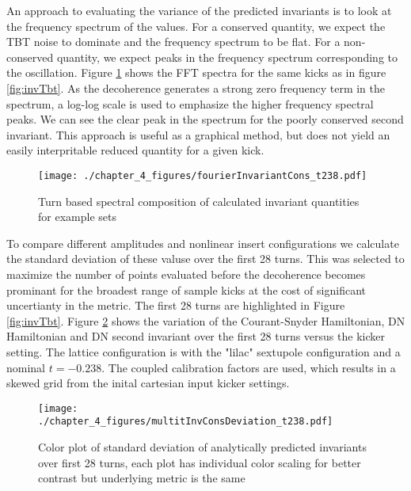 An approach to evaluating the variance of the predicted invariants is to look at the frequency spectrum of the values. For a conserved quantity, we expect the TBT noise to dominate and the frequency spectrum to be flat. For a non-conserved quantity, we expect peaks in the frequency spectrum corresponding to the oscillation. Figure \ref{fig:invLogLog} shows the FFT spectra for the same kicks as in figure \ref{fig:invTbt}. As the decoherence generates a strong zero frequency term in the spectrum, a log-log scale is used to emphasize the higher frequency spectral peaks. We can see the clear peak in the spectrum for the poorly conserved second invariant. This approach is useful as a graphical method, but does not yield an easily interpritable reduced quantity for a given kick.

\begin{figure}
	\centering
	\texttt{[image: ./chapter\_4\_figures/fourierInvariantCons\_t238.pdf]}
	\caption{Turn based spectral composition of calculated invariant quantities for example sets}
	\label{fig:invLogLog}
\end{figure}

To compare different amplitudes and nonlinear insert configurations we calculate the standard deviation of these valuse over the first 28 turns. This was selected to maximize the number of points evaluated before the decoherence becomes prominant for the broadest range of sample kicks at the cost of significant uncertianty in the metric. The first 28 turns are highlighted in Figure \ref{fig:invTbt}. Figure \ref{fig:invt238} shows the variation of the Courant-Snyder Hamiltonian, DN Hamiltonian and DN second invariant over the first 28 turns versus the kicker setting. The lattice configuration is with the "lilac" sextupole configuration and a nominal $t=-0.238$. The coupled calibration factors are used, which results in a skewed grid from the inital cartesian input kicker settings.

\begin{figure}
	\centering
	\texttt{[image: ./chapter\_4\_figures/multitInvConsDeviation\_t238.pdf]}
	\caption{Color plot of standard deviation of analytically predicted invariants over first 28 turns, each plot has individual color scaling for better contrast but underlying metric is the same}
	\label{fig:invt238}
\end{figure}

